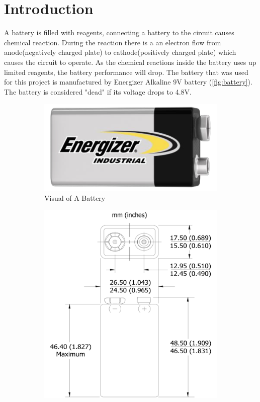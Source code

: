 \section{Introduction}
 A battery is filled with reagents, connecting a battery to the circuit causes chemical reaction. During the reaction there is a an electron flow from anode(negatively charged plate) to cathode(positively charged plate) which causes the circuit to operate. As the chemical reactions inside the battery uses up limited reagents, the battery performance will drop.\citep{schmidt2018batteries} The battery that was used for this project is manufactured by Energizer Alkaline 9V battery (\autoref{fig:battery}). The battery is considered "dead" if its voltage drops to 4.8V.\citep{batterydatasheet}\\
\begin{figure}[h!]
\centering
\begin{subfigure}{.3\textwidth}
  \centering
  \includegraphics[width=\textwidth]{battery1.png}
  \caption{Visual of A Battery}
  \label{fig:sub1}
\end{subfigure}%
\hspace{3cm}
\begin{subfigure}{.3\textwidth}
  \centering
  \includegraphics[width=\textwidth]{battery2.png}

\end{subfigure}
\end{figure}
